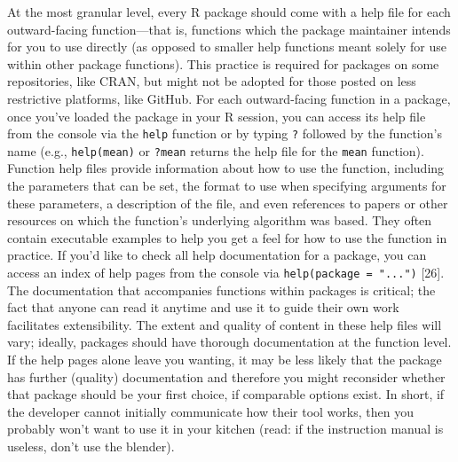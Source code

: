 \documentclass[10pt,letterpaper]{article}
\begin{document}
At the most granular level, every R package should come with a help file
for each outward-facing function---that is, functions which the package
maintainer intends for you to use directly (as opposed to smaller help
functions meant solely for use within other package functions). This
practice is required for packages on some repositories, like CRAN, but
might not be adopted for those posted on less restrictive platforms,
like GitHub. For each outward-facing function in a package, once you've
loaded the package in your R session, you can access its help file from
the console via the \texttt{help} function or by typing \texttt{?}
followed by the function's name (e.g., \texttt{help(mean)} or
\texttt{?mean} returns the help file for the \texttt{mean} function).
Function help files provide information about how to use the function,
including the parameters that can be set, the format to use when
specifying arguments for these parameters, a description of the file,
and even references to papers or other resources on which the function's
underlying algorithm was based. They often contain executable examples
to help you get a feel for how to use the function in practice. If you'd
like to check all help documentation for a package, you can access an
index of help pages from the console via
\texttt{help(package\ =\ "...")} {[}26{]}. The documentation that
accompanies functions within packages is critical; the fact that anyone
can read it anytime and use it to guide their own work facilitates
extensibility. The extent and quality of content in these help files
will vary; ideally, packages should have thorough documentation at the
function level. If the help pages alone leave you wanting, it may be
less likely that the package has further (quality) documentation and
therefore you might reconsider whether that package should be your first
choice, if comparable options exist. In short, if the developer cannot
initially communicate how their tool works, then you probably won't want
to use it in your kitchen (read: if the instruction manual is useless,
don't use the blender).
\end{document}
